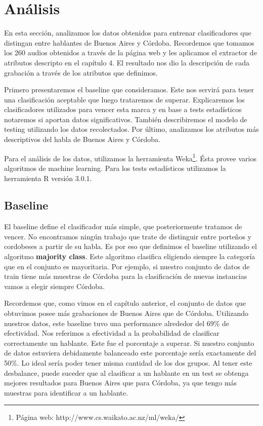 
\chapter{Análisis}

En esta sección, analizamos los datos obtenidos para entrenar clasificadores que distingan entre hablantes de Buenos Aires y Córdoba. Recordemos que tomamos los 260 audios obtenidos a través de la página web y les aplicamos el extractor de atributos descripto en el capítulo 4. El resultado nos dio la descripción de cada grabación a través de los atributos que definimos. 

Primero presentaremos el baseline que consideramos. Este nos servirá para tener una clasificación aceptable que luego trataremos de superar. Explicaremos los clasificadores utilizados para vencer esta marca y en base a tests estadísticos notaremos si aportan datos significativos. También describiremos el modelo de testing utilizando los datos recolectados. Por último, analizamos los atributos más descriptivos del habla de Buenos Aires y Córdoba. 

Para el análisis de los datos, utilizamos la herramienta Weka\footnote{Página web: http://www.cs.waikato.ac.nz/ml/weka/}. Ésta provee varios algoritmos de machine learning. Para los tests estadísticos utilizamos la herramienta R versión 3.0.1. 

\section{Baseline}

El baseline define el clasificador más simple, que posteriormente tratamos de vencer. No encontramos ningún trabajo que trate de distinguir entre porteños y cordobeses a partir de su habla. Es por eso que definimos el baseline utilizando el algoritmo \textbf{majority class}. Este algoritmo clasifica eligiendo siempre la categoría que en el conjunto es mayoritaria. Por ejemplo, si nuestro conjunto de datos de train tiene más muestras de Córdoba para la clasificación de nuevas instancias vamos a elegir siempre Córdoba.

Recordemos que, como vimos en el capítulo anterior, el conjunto de datos que obtuvimos posee más grabaciones de Buenos Aires que de Córdoba. Utilizando nuestros datos, este baseline tuvo una performance alrededor del 69\% de efectividad. Nos referimos a efectividad a la probabilidad de clasificar correctamente un hablante. Este fue el porcentaje a superar. Si nuestro conjunto de datos estuviera debidamente balanceado este porcentaje sería exactamente del 50\%. Lo ideal sería poder tener misma cantidad de los dos grupos. Al tener este desbalance, puede suceder que al clasificar a un hablante en un test se obtenga mejores resultados para Buenos Aires que para Córdoba, ya que tengo más muestras para identificar a un hablante.

